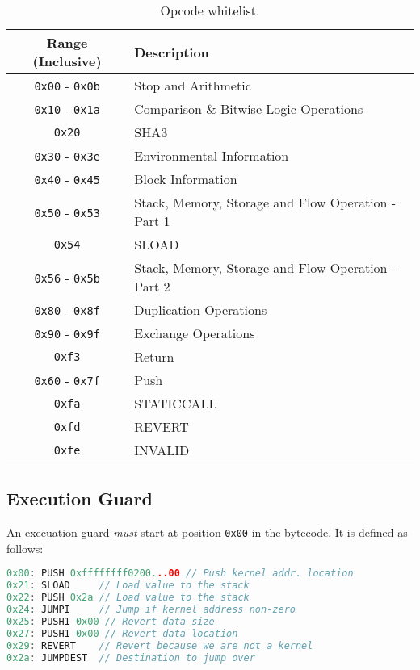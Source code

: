 \documentclass[english,a4paper]{article}
\begin{document}
\begin{table}[H]
  \caption{Opcode whitelist.}
  \centering{}%
  \begin{tabularx}{\textwidth}{c | X }
    \hline
    Range (Inclusive) & Description \\
    \hline
    \hline
    \texttt{0x00} - \texttt{0x0b} & Stop and Arithmetic \\
    \texttt{0x10} - \texttt{0x1a} & Comparison \& Bitwise Logic Operations \\
    \texttt{0x20} & SHA3 \\
    \texttt{0x30} - \texttt{0x3e} & Environmental Information \\
    \texttt{0x40} - \texttt{0x45} & Block Information \\
    \texttt{0x50} - \texttt{0x53} & Stack, Memory, Storage and Flow Operation - Part 1\\
    \texttt{0x54} & SLOAD \\
    \texttt{0x56} - \texttt{0x5b} & Stack, Memory, Storage and Flow Operation - Part 2 \\
    \texttt{0x80} - \texttt{0x8f} & Duplication Operations \\
    \texttt{0x90} - \texttt{0x9f} & Exchange Operations \\
    \texttt{0xf3} & Return \\
    \texttt{0x60} - \texttt{0x7f} & Push \\
    \texttt{0xfa} & STATICCALL \\
    \texttt{0xfd} & REVERT \\
    \texttt{0xfe} & INVALID \\
    \hline
  \end{tabularx}
\end{table}

\subsection{Execution Guard}\label{execution-guard}
An execuation guard \emph{must} start at position \texttt{0x00} in the bytecode.
It is defined as follows:

\begin{minipage}{\linewidth}
\small
\begin{lstlisting}[language=c,commentstyle=\color{mygreen},basicstyle=\ttfamily,
  identifierstyle=\color{blue},
  caption=Sequence of steps which constitutes an execution guard.]
0x00: PUSH 0xffffffff0200...00 // Push kernel addr. location
0x21: SLOAD     // Load value to the stack
0x22: PUSH 0x2a // Load value to the stack
0x24: JUMPI     // Jump if kernel address non-zero
0x25: PUSH1 0x00 // Revert data size
0x27: PUSH1 0x00 // Revert data location
0x29: REVERT    // Revert because we are not a kernel
0x2a: JUMPDEST  // Destination to jump over
\end{lstlisting}
\end{minipage}
\end{document}
